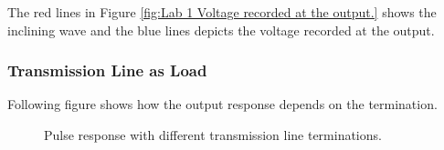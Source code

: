 \documentclass[report.tex]{subfiles}
\begin{document}
The red lines in Figure \ref{fig:Lab 1 Voltage recorded at the output.} shows the inclining wave and the blue lines depicts the voltage recorded at the output.

\subsubsection{Transmission Line as Load}
Following figure shows how the output response depends on the termination.

\begin{figure}[H]
	\centering
	\caption{Pulse response with different transmission line terminations.}
	\label{fig:Lab 1 Pulse responses.}
\end{figure}
\end{document}
